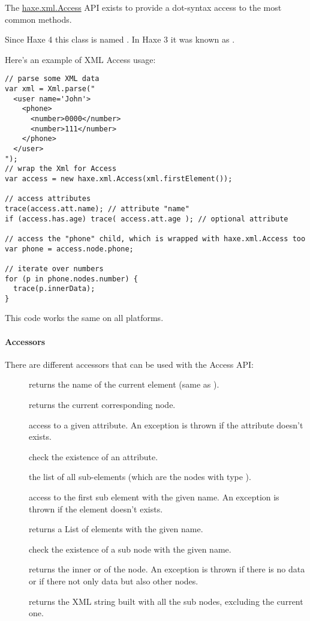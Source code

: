 The \href{https://api.haxe.org/haxe/xml/Access.html}{haxe.xml.Access} API exists to provide a dot-syntax access to the most common  methods.

Since Haxe 4 this class is named . In Haxe 3 it was known as .

Here's an example of XML Access usage:
\begin{lstlisting}
// parse some XML data
var xml = Xml.parse("
  <user name='John'>
    <phone>
      <number>0000</number>
      <number>111</number>
    </phone>
  </user>
");
// wrap the Xml for Access
var access = new haxe.xml.Access(xml.firstElement());

// access attributes
trace(access.att.name); // attribute "name"
if (access.has.age) trace( access.att.age ); // optional attribute

// access the "phone" child, which is wrapped with haxe.xml.Access too
var phone = access.node.phone;

// iterate over numbers
for (p in phone.nodes.number) {
  trace(p.innerData);
}
\end{lstlisting}
This code works the same on all platforms.

\paragraph{Accessors}
There are different accessors that can be used with the Access API:
\begin{description}
	\item[] returns the name of the current element (same as ).
	\item[] returns the current corresponding  node.
	\item[] access to a given attribute. An exception is thrown if the attribute doesn't exists.
	\item[] check the existence of an attribute.
	\item[] the list of all sub-elements (which are the nodes with type ).
	\item[] access to the first sub element with the given name. An exception is thrown if the element doesn't exists.
	\item[] returns a List of elements with the given name.
	\item[] check the existence of a sub node with the given name.
	\item[] returns the inner  or  of the node. An exception is thrown if there is no data or if there not only data but also other nodes.
	\item[] returns the XML string built with all the sub nodes, excluding the current one.
\end{description}

